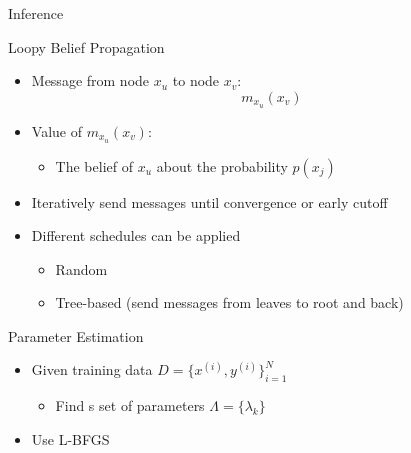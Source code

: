 \documentclass[presentation,bigger]{beamer}
\begin{document}
\begin{frame}[label={sec:orgheadline20}]{Inference}
\begin{block}{Loopy Belief Propagation}
\begin{itemize}
\item Message from node \(x_u\) to node \(x_v\):
\[ m_{x_u}(x_v) \]
\item Value of \(m_{x_u}(x_v)\):
\begin{itemize}
\item The belief of \(x_u\) about the probability \(p(x_j)\)
\end{itemize}
\item Iteratively send messages until convergence or early cutoff
\item Different schedules can be applied
\begin{itemize}
\item Random
\item Tree-based (send messages from leaves to root and back)
\end{itemize}
\end{itemize}
\end{block}
\end{frame}
\begin{frame}[label={sec:orgheadline21}]{Parameter Estimation}
\begin{itemize}
\item Given training data \(D = \{x^{(i)},y^{(i)}\}^N_{i=1}\)
\begin{itemize}
\item Find s set of parameters \(\Lambda = \{\lambda_k\}\)
\end{itemize}
\item Use L-BFGS
\end{itemize}
\end{frame}
\end{document}
